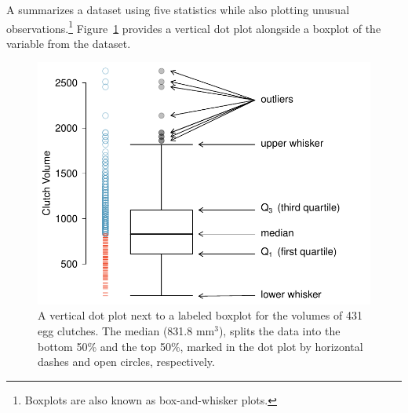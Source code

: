 \begin{doublespace}

A  summarizes a dataset using five statistics while also plotting unusual observations.\footnote{Boxplots are also known as box-and-whisker plots.} Figure~\ref{frogBoxPlot} provides a vertical dot plot alongside a boxplot of the  variable from the  dataset. 

\begin{figure}[th]
	\centering
	\includegraphics[width=0.86\mycaptionwidth]{ch_intro_to_data_oi_biostat/figures/frogBoxPlot/frogBoxPlot}
	\caption{A vertical dot plot next to a labeled boxplot for the volumes of 431 egg clutches. The median (831.8 $\textrm {mm}^{3}$), splits the data into the bottom 50\% and the top 50\%, marked in the dot plot by horizontal dashes and open circles, respectively.}
	\label{frogBoxPlot}
\end{figure}


\end{doublespace}

